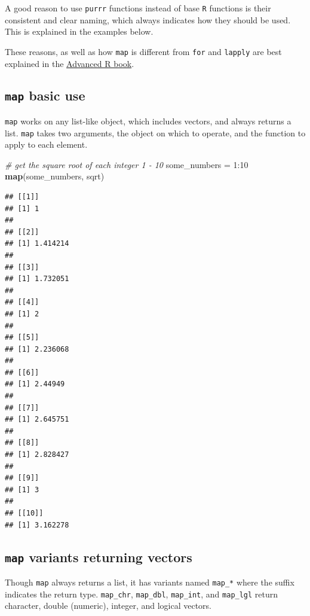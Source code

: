 \documentclass[]{book}
\newenvironment{Shaded}{}{}
\newcommand{\CommentTok}[1]{\textcolor[rgb]{0.38,0.63,0.69}{\textit{#1}}}
\newcommand{\DecValTok}[1]{\textcolor[rgb]{0.25,0.63,0.44}{#1}}
\newcommand{\KeywordTok}[1]{\textcolor[rgb]{0.00,0.44,0.13}{\textbf{#1}}}
\newcommand{\NormalTok}[1]{#1}
\newcommand{\OperatorTok}[1]{\textcolor[rgb]{0.40,0.40,0.40}{#1}}
\newcommand{\StringTok}[1]{\textcolor[rgb]{0.25,0.44,0.63}{#1}}
\begin{document}
A good reason to use \texttt{purrr} functions instead of base \texttt{R} functions is their consistent and clear naming, which always indicates how they should be used.
This is explained in the examples below.

These reasons, as well as how \texttt{map} is different from \texttt{for} and \texttt{lapply} are best explained in the \href{https://adv-r.hadley.nz/functionals.html}{Advanced R book}.

\hypertarget{map-basic-use}{%
\subsection{\texorpdfstring{\texttt{map} basic use}{map basic use}}\label{map-basic-use}}

\texttt{map} works on any list-like object, which includes vectors, and always returns a list. \texttt{map} takes two arguments, the object on which to operate, and the function to apply to each element.

\begin{Shaded}
\begin{Highlighting}[]
\CommentTok{# get the square root of each integer 1 - 10}
\NormalTok{some_numbers =}\StringTok{ }\DecValTok{1}\OperatorTok{:}\DecValTok{10}
\KeywordTok{map}\NormalTok{(some_numbers, sqrt)}
\end{Highlighting}
\end{Shaded}

\begin{verbatim}
## [[1]]
## [1] 1
## 
## [[2]]
## [1] 1.414214
## 
## [[3]]
## [1] 1.732051
## 
## [[4]]
## [1] 2
## 
## [[5]]
## [1] 2.236068
## 
## [[6]]
## [1] 2.44949
## 
## [[7]]
## [1] 2.645751
## 
## [[8]]
## [1] 2.828427
## 
## [[9]]
## [1] 3
## 
## [[10]]
## [1] 3.162278
\end{verbatim}

\hypertarget{map-variants-returning-vectors}{%
\subsection{\texorpdfstring{\texttt{map} variants returning vectors}{map variants returning vectors}}\label{map-variants-returning-vectors}}

Though \texttt{map} always returns a list, it has variants named \texttt{map\_*} where the suffix indicates the return type.
\texttt{map\_chr}, \texttt{map\_dbl}, \texttt{map\_int}, and \texttt{map\_lgl} return character, double (numeric), integer, and logical vectors.
\end{document}
